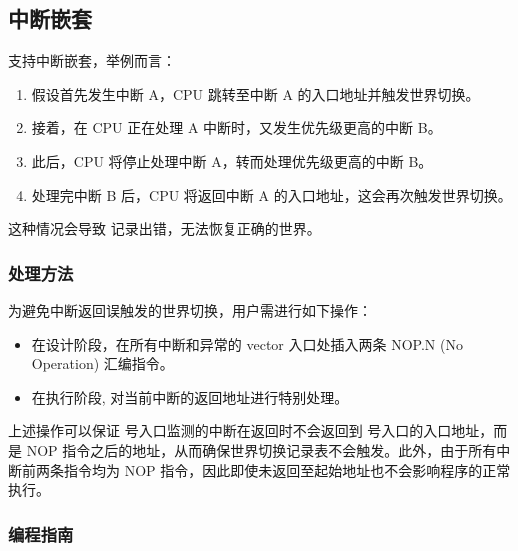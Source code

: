 \documentclass[main\_\_CN.tex]{subfiles}
\begin{document}
\subsection{中断嵌套}

\chipname{} 支持中断嵌套，举例而言：

\begin{enumerate}

    \item 假设首先发生中断 A，CPU 跳转至中断 A 的入口地址并触发世界切换。
    \item 接着，在 CPU 正在处理 A 中断时，又发生优先级更高的中断 B。
    \item 此后，CPU 将停止处理中断 A，转而处理优先级更高的中断 B。
    \item 处理完中断 B 后，CPU 将返回中断 A 的入口地址，这会再次触发世界切换。
\end{enumerate}

这种情况会导致  记录出错，无法恢复正确的世界。

\subsubsection{处理方法}
为避免中断返回误触发的世界切换，用户需进行如下操作：
\begin{itemize}
    \item 在设计阶段，在所有中断和异常的 vector 入口处插入两条 NOP.N (No Operation) 汇编指令。
    \item 在执行阶段, 对当前中断的返回地址进行特别处理。
\end{itemize}

上述操作可以保证  号入口监测的中断在返回时不会返回到  号入口的入口地址，而是 NOP 指令之后的地址，从而确保世界切换记录表不会触发。此外，由于所有中断前两条指令均为 NOP 指令，因此即使未返回至起始地址也不会影响程序的正常执行。

\subsubsection{编程指南}
\end{document}

